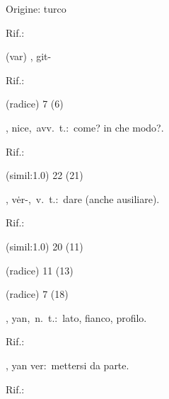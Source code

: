 \begin{glossario}{Origine: turco}
\begin{subvocedue}
\item[Rif.:] 
\end{subvocedue}
\begin{subvocedue}
\item[(var)] , {\sf git-}\begin{subvocedue}
\item[Rif.:] 
\end{subvocedue}
\item[(radice)]   7 (6)
\end{subvocedue}
\item[{\color{colorlowref}\spzrl{ni^c.H}},] {\sf nice},\ avv.\ t.:\ come? in che modo?.
\begin{subvocedue}
\item[Rif.:] 
\end{subvocedue}
\begin{subvocedue}
\item[(simil:1.0)]   22 (21)
\end{subvocedue}
\item[{\color{colorlowref}\spzrl{:v.ErB}},] {\sf vėr-},\ v.\ t.:\ dare (anche ausiliare).
\begin{subvocedue}
\item[Rif.:] 
\end{subvocedue}
\begin{subvocedue}
\item[(simil:1.0)]   20 (11)
\item[(radice)]   11 (13)
\item[(radice)]   7 (18)
\end{subvocedue}
\item[{\color{colorlowref}\spzrl{y^An}},] {\sf yan},\ n.\ t.:\ lato, fianco, profilo.
\begin{subvocedue}
\item[Rif.:] 
\end{subvocedue}
\begin{subvocedue}
\item[\subglossariobullet] , {\sf yan ver}:\ mettersi da parte.
\begin{subvocedue}
\item[Rif.:] 
\end{subvocedue}

\end{subvocedue}
\end{glossario}
